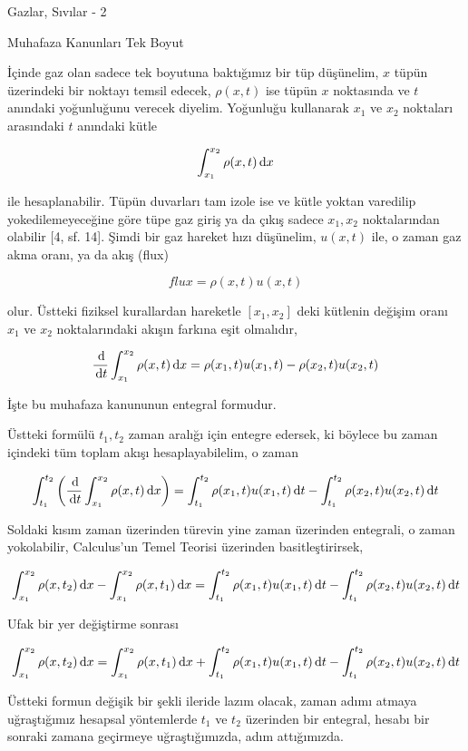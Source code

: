 \documentclass[12pt,fleqn]{article}\usepackage{../../common}
\begin{document}
Gazlar, Sıvılar - 2

Muhafaza Kanunları Tek Boyut

İçinde gaz olan sadece tek boyutuna baktığımız bir tüp düşünelim, $x$ tüpün
üzerindeki bir noktayı temsil edecek, $\rho(x,t)$ ise tüpün $x$ noktasında ve
$t$ anındaki yoğunluğunu verecek diyelim. Yoğunluğu kullanarak $x_1$ ve $x_2$
noktaları arasındaki $t$ anındaki kütle

$$
\int_{x_1}^{x_2} \rho(x,t) \,\mathrm{d} x
$$

ile hesaplanabilir. Tüpün duvarları tam izole ise ve kütle yoktan varedilip
yokedilemeyeceğine göre tüpe gaz giriş ya da çıkış sadece $x_1,x_2$
noktalarından olabilir [4, sf. 14]. Şimdi bir gaz hareket hızı düşünelim,
$u(x,t)$ ile, o zaman gaz akma oranı, ya da akış (flux)

$$
flux = \rho(x,t) u(x,t)
$$

olur. Üstteki fiziksel kurallardan hareketle $[x_1,x_2]$ deki kütlenin
değişim oranı $x_1$ ve $x_2$ noktalarındaki akışın farkına eşit olmalıdır,

$$
\frac{\,\mathrm{d}}{\,\mathrm{d} t} \int_{x_1}^{x_2} \rho(x,t) \,\mathrm{d} x =
\rho(x_1,t) u(x_1,t) - \rho(x_2,t) u(x_2,t)
$$

İşte bu muhafaza kanununun entegral formudur. 

Üstteki formülü $t_1,t_2$ zaman aralığı için entegre edersek, ki böylece
bu zaman içindeki tüm toplam akışı hesaplayabilelim, o zaman

$$
\int_{t_1}^{t_2} \left( \frac{\,\mathrm{d}}{\,\mathrm{d} t} \int_{x_1}^{x_2} \rho(x,t) \,\mathrm{d} x  \right)  =
\int_{t_1}^{t_2} \rho(x_1,t) u(x_1,t) \,\mathrm{d} t -
\int_{t_1}^{t_2} \rho(x_2,t) u(x_2,t) \,\mathrm{d} t
$$

Soldaki kısım zaman üzerinden türevin yine zaman üzerinden entegrali, o zaman
yokolabilir, Calculus'un Temel Teorisi üzerinden basitleştirirsek,

$$
\int_{x_1}^{x_2} \rho(x,t_2) \,\mathrm{d} x -
\int_{x_1}^{x_2} \rho(x,t_1) \,\mathrm{d} x  = 
\int_{t_1}^{t_2} \rho(x_1,t) u(x_1,t) \,\mathrm{d} t -
\int_{t_1}^{t_2}  \rho(x_2,t) u(x_2,t) \,\mathrm{d} t
$$

Ufak bir yer değiştirme sonrası

$$
\int_{x_1}^{x_2} \rho(x,t_2) \,\mathrm{d} x =
\int_{x_1}^{x_2} \rho(x,t_1) \,\mathrm{d} x  +
\int_{t_1}^{t_2} \rho(x_1,t) u(x_1,t) \,\mathrm{d} t -
\int_{t_1}^{t_2}  \rho(x_2,t) u(x_2,t) \,\mathrm{d} t
$$

Üstteki formun değişik bir şekli ileride lazım olacak, zaman adımı atmaya
uğraştığımız hesapsal yöntemlerde $t_1$ ve $t_2$ üzerinden bir entegral, hesabı
bir sonraki zamana geçirmeye uğraştığımızda, adım attığımızda.
\end{document}
